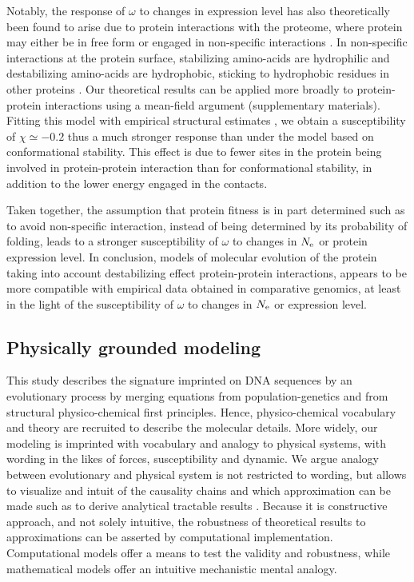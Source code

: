 \documentclass{MBE}%
\begin{document}
Notably, the response of $\omega$ to changes in expression level has  also theoretically been found to arise due to protein interactions with the proteome, where protein may either be in free form or engaged in non-specific interactions \citep{Yang2012, Zhang2013}.
In non-specific interactions at the protein surface, stabilizing amino-acids are hydrophilic and destabilizing amino-acids are hydrophobic, sticking to hydrophobic residues in other proteins \citep{Dixit2013,Manhart2015}.
Our theoretical results can be applied more broadly to protein-protein interactions using a mean-field argument (supplementary materials).
Fitting this model with empirical structural estimates \citep{Janin1995a, Zhang2008}, we obtain a susceptibility of $\chi \simeq -0.2$ thus a much stronger response than under the model based on conformational stability.
This effect is due to fewer sites in the protein being involved in protein-protein interaction than for conformational stability, in addition to the lower energy engaged in the contacts.

Taken together, the assumption that protein fitness is in part determined such as to avoid non-specific interaction, instead of being determined by its probability of folding, leads to a stronger susceptibility of $\omega$ to changes in $N_{\mathrm{e}}$ or protein expression level.
In conclusion, models of molecular evolution of the protein taking into account destabilizing effect protein-protein interactions, appears to be more compatible with empirical data obtained in comparative genomics, at least in the light of the susceptibility of $\omega$ to changes in $N_{\mathrm{e}}$ or expression level.

\subsection*{Physically grounded modeling}
This study describes the signature imprinted on DNA sequences by an evolutionary process by merging equations from population-genetics and from structural physico-chemical first principles.
Hence, physico-chemical vocabulary and theory are recruited to describe the molecular details.
More widely, our modeling is imprinted with vocabulary and analogy to physical systems, with wording in the likes of forces, susceptibility and dynamic.
We argue analogy between evolutionary and physical system is not restricted to wording, but allows to visualize and intuit of the causality chains and which approximation can be made such as to derive analytical tractable results \citep{Bastolla2012, Bastolla2017}.
Because it is constructive approach, and not solely intuitive, the robustness of theoretical results to approximations can be asserted by computational implementation. 
Computational models offer a means to test the validity and robustness, while mathematical models offer an intuitive mechanistic mental analogy.
\end{document}
